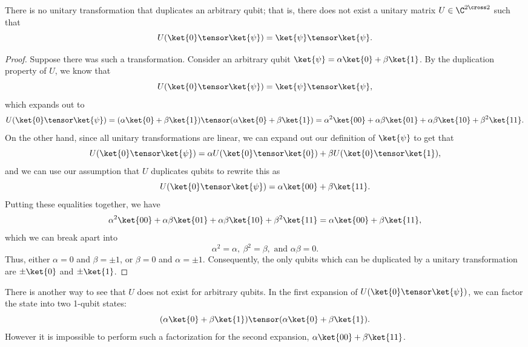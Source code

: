 \begin{theorem}\label{thm:no-cloning}
  There is no unitary transformation that duplicates an arbitrary qubit; that
  is, there does not exist a unitary matrix $U \in \C^{2 \cross 2}$ such that \[
  U(\ket{0}\tensor\ket{\psi}) = \ket{\psi}\tensor\ket{\psi}.\]
\end{theorem}
\begin{proof}
  Suppose there was such a transformation.
  Consider an arbitrary qubit $\ket{\psi} = \alpha\ket{0} + \beta\ket{1}$. 
  By the duplication property of $U$, we know that
  \[ U(\ket{0} \tensor \ket{\psi}) = \ket{\psi} \tensor \ket{\psi},
  \] 
  which expands out to 
  \[
      U(\ket{0} \tensor \ket{\psi})
    = (\alpha\ket{0} + \beta\ket{1}) \tensor (\alpha\ket{0} + \beta\ket{1})
    = \alpha^2    \ket{00}
    + \alpha\beta \ket{01}
    + \alpha\beta \ket{10}
    + \beta^2     \ket{11}.
  \]  On the other hand, since all unitary transformations are linear, we can
  expand out our definition of $\ket{\psi}$ to get that \[
      U(\ket{0} \tensor \ket{\psi})
    = \alpha U(\ket{0} \tensor \ket{0}) + \beta U(\ket{0} \tensor \ket{1}),
  \] and we can use our assumption that $U$ duplicates qubits to rewrite this
  as \[
    U(\ket{0} \tensor \ket{\psi}) = \alpha \ket{00} + \beta \ket{11}.
  \]  Putting these equalities together, we have \[
      \alpha^2    \ket{00}
    + \alpha\beta \ket{01}
    + \alpha\beta \ket{10}
    + \beta^2     \ket{11}
    = \alpha \ket{00} + \beta \ket{11},
  \] which we can break apart into \[
    \alpha^2 = \alpha,\ \beta^2 = \beta,\text{ and } \alpha\beta = 0.
  \]  Thus, either $\alpha = 0$ and $\beta = \pm1$, or $\beta = 0$ and $\alpha =
  \pm1$.  Consequently, the only qubits which can be duplicated by a unitary
  transformation are $\pm\ket{0}$ and $\pm\ket{1}$.
\end{proof}

There is another way to see that $U$ does not exist for arbitrary qubits. In the
first expansion of $U(\ket{0} \tensor \ket{\psi})$, we can factor the state into two
1-qubit states:
\[ (\alpha\ket{0} + \beta\ket{1}) \tensor (\alpha\ket{0} + \beta\ket{1}). \]
However it is impossible to perform such a factorization for the second expansion,
$\alpha\ket{00} + \beta\ket{11}$.


